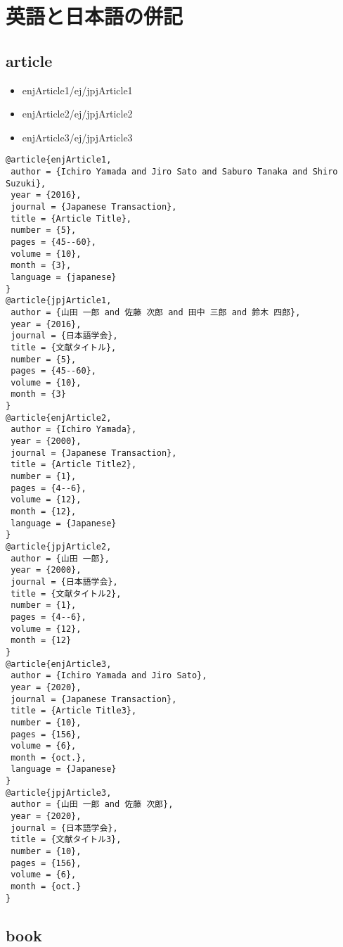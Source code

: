\documentclass[9pt, twocolumn, a4paper]{jsarticle}
\begin{document}
\section{英語と日本語の併記}
\begin{bibunit}[IEEJtran]

\subsection{article}

\begin{itemize}
  \item enjArticle1/ej/jpjArticle1 \cite{enjArticle1/ej/jpjArticle1}
  \item enjArticle2/ej/jpjArticle2 \cite{enjArticle2/ej/jpjArticle2}
  \item enjArticle3/ej/jpjArticle3 \cite{enjArticle3/ej/jpjArticle3}
\end{itemize}

\begin{lstlisting}
@article{enjArticle1,
 author = {Ichiro Yamada and Jiro Sato and Saburo Tanaka and Shiro Suzuki},
 year = {2016},
 journal = {Japanese Transaction},
 title = {Article Title},
 number = {5},
 pages = {45--60},
 volume = {10},
 month = {3},
 language = {japanese}
}
@article{jpjArticle1,
 author = {山田 一郎 and 佐藤 次郎 and 田中 三郎 and 鈴木 四郎},
 year = {2016},
 journal = {日本語学会},
 title = {文献タイトル},
 number = {5},
 pages = {45--60},
 volume = {10},
 month = {3}
}
@article{enjArticle2,
 author = {Ichiro Yamada},
 year = {2000},
 journal = {Japanese Transaction},
 title = {Article Title2},
 number = {1},
 pages = {4--6},
 volume = {12},
 month = {12},
 language = {Japanese}
}
@article{jpjArticle2,
 author = {山田 一郎},
 year = {2000},
 journal = {日本語学会},
 title = {文献タイトル2},
 number = {1},
 pages = {4--6},
 volume = {12},
 month = {12}
}
@article{enjArticle3,
 author = {Ichiro Yamada and Jiro Sato},
 year = {2020},
 journal = {Japanese Transaction},
 title = {Article Title3},
 number = {10},
 pages = {156},
 volume = {6},
 month = {oct.},
 language = {Japanese}
}
@article{jpjArticle3,
 author = {山田 一郎 and 佐藤 次郎},
 year = {2020},
 journal = {日本語学会},
 title = {文献タイトル3},
 number = {10},
 pages = {156},
 volume = {6},
 month = {oct.}
}
\end{lstlisting}

\subsection{book}


\end{bibunit}
\end{document}
